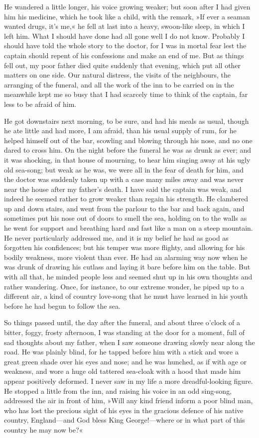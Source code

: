 He wandered a little longer, his voice growing weaker; but soon after I had given him his medicine, which he took like a child, with the remark, »If ever a seaman wanted drugs, it's me,« he fell at last into a heavy, swoon-like sleep, in which I left him. What I should have done had all gone well I do not know. Probably I should have told the whole story to the doctor, for I was in mortal fear lest the captain should repent of his confessions and make an end of me. But as things fell out, my poor father died quite suddenly that evening, which put all other matters on one side. Our natural distress, the visits of the neighbours, the arranging of the funeral, and all the work of the inn to be carried on in the meanwhile kept me so busy that I had scarcely time to think of the captain, far less to be afraid of him.

He got downstairs next morning, to be sure, and had his meals as usual, though he ate little and had more, I am afraid, than his usual supply of rum, for he helped himself out of the bar, scowling and blowing through his nose, and no one dared to cross him. On the night before the funeral he was as drunk as ever; and it was shocking, in that house of mourning, to hear him singing away at his ugly old sea-song; but weak as he was, we were all in the fear of death for him, and the doctor was suddenly taken up with a case many miles away and was never near the house after my father's death. I have said the captain was weak, and indeed he seemed rather to grow weaker than regain his strength. He clambered up and down stairs, and went from the parlour to the bar and back again, and sometimes put his nose out of doors to smell the sea, holding on to the walls as he went for support and breathing hard and fast like a man on a steep mountain. He never particularly addressed me, and it is my belief he had as good as forgotten his confidences; but his temper was more flighty, and allowing for his bodily weakness, more violent than ever. He had an alarming way now when he was drunk of drawing his cutlass and laying it bare before him on the table. But with all that, he minded people less and seemed shut up in his own thoughts and rather wandering. Once, for instance, to our extreme wonder, he piped up to a different air, a kind of country love-song that he must have learned in his youth before he had begun to follow the sea.

So things passed until, the day after the funeral, and about three o'clock of a bitter, foggy, frosty afternoon, I was standing at the door for a moment, full of sad thoughts about my father, when I saw someone drawing slowly near along the road. He was plainly blind, for he tapped before him with a stick and wore a great green shade over his eyes and nose; and he was hunched, as if with age or weakness, and wore a huge old tattered sea-cloak with a hood that made him appear positively deformed. I never saw in my life a more dreadful-looking figure. He stopped a little from the inn, and raising his voice in an odd sing-song, addressed the air in front of him, »Will any kind friend inform a poor blind man, who has lost the precious sight of his eyes in the gracious defence of his native country, England—and God bless King George!—where or in what part of this country he may now be?«

